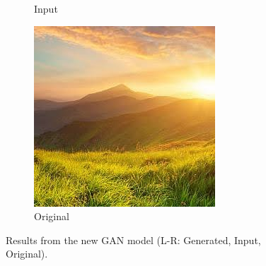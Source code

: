 \documentclass[sigconf]{acmart}
\begin{document}
\begin{figure}[h]
\begin{subfigure}[b]{0.3\linewidth}
        \caption{Input}
    \end{subfigure}
    \hfill
    \begin{subfigure}[b]{0.3\linewidth}
        \includegraphics[width=\linewidth]{original1.jpg}
        \caption{Original}
    \end{subfigure}
    \caption{Results from the new GAN model (L-R: Generated, Input, Original).}
\end{figure}
\end{document}

